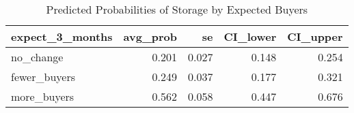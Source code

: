 \begin{table}[htbp]
\centering
\begin{tabular}{lrrrr}
  \hline
expect\_3\_months & avg\_prob & se & CI\_lower & CI\_upper \\ 
  \hline
no\_change & 0.201 & 0.027 & 0.148 & 0.254 \\ 
  fewer\_buyers & 0.249 & 0.037 & 0.177 & 0.321 \\ 
  more\_buyers & 0.562 & 0.058 & 0.447 & 0.676 \\ 
   \hline
\end{tabular}
\caption{Predicted Probabilities of Storage by Expected Buyers} 
\label{tab:predicted_probs}
\end{table}
